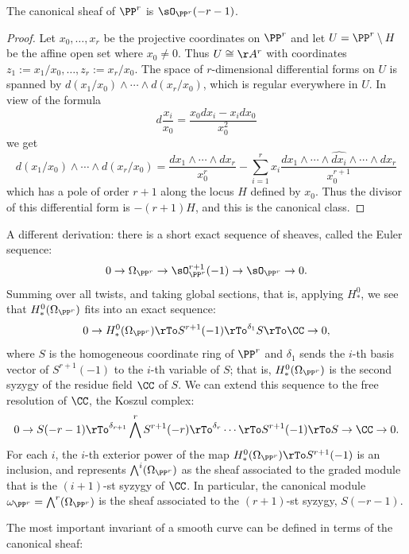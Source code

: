 \begin{theorem}
 The canonical sheaf of $\PP^{r}$ is $\sO_{\PP^{r}}(-r-1)$. 
\end{theorem}
\begin{proof}
Let $x_{0}, \dots, x_{r}$ be the projective coordinates on $\PP^{r}$ and let  $U = \PP^{r}\setminus H$ be the affine open set where $x_{0} \neq 0$. Thus $U \cong \AA^{r}$ with coordinates $z_{1} := x_{1}/x_{0}, \dots, z_{r}:=x_{r}/x_{0}$. The space of $r$-dimensional differential forms on $U$ is spanned by $d(x_{1}/x_{0})\wedge\cdots\wedge d(x_{r}/x_{0})$, which is regular everywhere in $U$. In view of the formula
$$
d\frac{x_{i}}{x_{0}} = \frac{x_{0}dx_{i}-x_{i}dx_{0}}{x_{0}^{2}}
$$
we get
$$
d(x_{1}/x_{0})\wedge\cdots\wedge d(x_{r}/x_{0}) = \frac{dx_{1}\wedge\cdots\wedge dx_{r}}{x_{0}^{r}}-
\sum_{i=1}^{r} x_{i} \frac{ dx_{1}\wedge\cdots \wedge \widehat{dx_{i}}\wedge \cdots \wedge dx_{r}}{x_{0}^{r+1}}
$$
which has a pole of order $r+1$ along the locus $H$ defined by $x_{0}$. Thus the divisor of this differential form
is $-(r+1)H$, and this is the canonical class.
\end{proof}

\begin{fact}
A different derivation: there is a short exact sequence of sheaves, called the Euler sequence:
$$
0\to \Omega_{\PP^{r}} \to \sO_{\PP^{r}}^{r+1} (-1) \to \sO_{\PP^{r}} \to 0.
$$
Summing over all twists, and taking global sections, that is, applying $H^0_*$, we see that 
$H^0_*(\Omega_{\PP^{r}})$ fits into an exact sequence:
$$
0 \to H^0_*(\Omega_{\PP^{r}}) \rTo S^{r+1}(-1) \rTo^{\delta_{1}} S \rTo \CC \to 0,
$$
where $S$ is the homogeneous coordinate ring of $\PP^r$ and $\delta_1$ sends the $i$-th basis vector of
$S^{r+1}(-1)$ to the $i$-th variable of $S$; that is, $H^0_*(\Omega_{\PP^{r}})$ is the second syzygy of the residue field $\CC$ of $S$. We can extend this sequence to  the free resolution
of $\CC$, the Koszul complex:
$$
0 \to S(-r-1) \rTo^{\delta_{r+1}} \bigwedge^rS^{r+1}(-r) \rTo^{\delta_{r}} \cdots \rTo S^{r+1}(-1) \rTo S \to \CC \to 0.
$$
For each $i$, the $i$-th exterior power of the map $H^0_*(\Omega_{\PP^{r}}) \rTo S^{r+1}(-1)$ is an inclusion, and
represents $\bigwedge^i(\Omega_{\PP^{r}})$ as the sheaf associated to the graded module that is the $(i+1)$-st syzygy of $\CC$.
In particular, the canonical module $\omega_{\PP^r} = \bigwedge^r(\Omega_{\PP^{r}})$ is the sheaf associated to the 
$(r+1)$-st syzygy, $S(-r-1)$.
\end{fact}

The most important invariant of a smooth curve can be defined in terms of the canonical sheaf:

